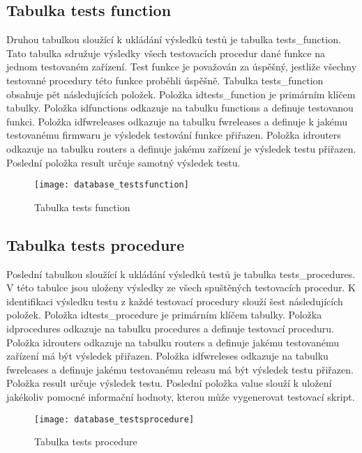 \subsection{Tabulka tests function}
Druhou tabulkou sloužící k ukládání výsledků testů je tabulka tests\_function. Tato tabulka sdružuje výsledky všech testovacích procedur dané funkce na jednom testovaném zařízení. Test funkce je považován za úspěšný, jestliže všechny testované procedury této funkce proběhli úspěšně. Tabulka tests\_function obsahuje pět následujících položek. Položka idtests\_function je primárním klíčem tabulky. Položka idfunctions odkazuje na tabulku functions a definuje testovanou funkci. Položka idfwreleases odkazuje na tabulku fwreleases a definuje k jakému testovanému firmwaru je výsledek testování funkce přiřazen. Položka idrouters odkazuje na tabulku routers a definuje jakému zařízení je výsledek testu přiřazen. Poslední položka result určuje samotný výsledek testu.

\begin{figure}[h]
  \centering
  \texttt{[image: database\_testsfunction]}
  \caption{Tabulka tests function}
  \label{fig:database_testsfunction}
\end{figure}

\subsection{Tabulka tests procedure}
Poslední tabulkou sloužící k ukládání výsledků testů je tabulka tests\_procedures. V této tabulce jsou uloženy výsledky ze všech spuštěných testovacích procedur. K identifikaci výsledku testu z každé testovací procedury slouží šest následujících položek. Položka idtests\_procedure je primárním klíčem tabulky. Položka idprocedures odkazuje na tabulku procedures a definuje testovací proceduru. Položka idrouters odkazuje na tabulku routers a definuje jakému testovanému zařízení má být výsledek přiřazen. Položka idfwreleses odkazuje na tabulku fwreleases a definuje jakému testovanému releasu má být výsledek testu přiřazen. Položka result určuje výsledek testu. Poslední položka value slouží k uložení jakékoliv pomocné informační hodnoty, kterou může vygenerovat testovací skript.

\begin{figure}[h]
  \centering
  \texttt{[image: database\_testsprocedure]}
  \caption{Tabulka tests procedure}
  \label{fig:database_testsprocedure}
\end{figure}


